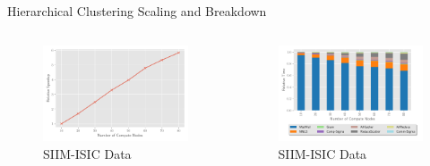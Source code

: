 \documentclass{beamer}
\newcommand{\image}{SIIM-ISIC}
\begin{document}
\newcommand{\figscal}{\textwidth}

\begin{frame}{Hierarchical Clustering Scaling and Breakdown}
    \centering
    \begin{columns}
        \begin{column}{0.5\textwidth}
            \begin{figure}
            \includegraphics[width=\figscal]{../plots/realworld_hierarchical_speedup.pdf}
            \caption{\image{} Data}
            \end{figure}
        \end{column}
        \begin{column}{0.5\textwidth}
            \begin{figure}
            \includegraphics[width=\figscal]{../plots/realworld_hier_strongscaling.pdf}
            \caption{\image{} Data}
            \end{figure}

\end{column}
\end{columns}
\end{frame}
\end{document}
